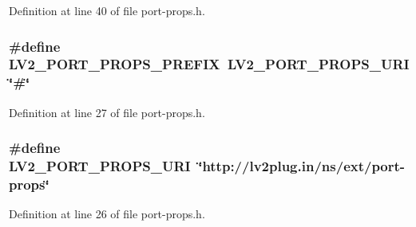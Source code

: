 Definition at line 40 of file port-\/props.\+h.

\subsubsection[{\texorpdfstring{L\+V2\+\_\+\+P\+O\+R\+T\+\_\+\+P\+R\+O\+P\+S\+\_\+\+P\+R\+E\+F\+IX}{LV2_PORT_PROPS_PREFIX}}]{\setlength{\rightskip}{0pt plus 5cm}\#define L\+V2\+\_\+\+P\+O\+R\+T\+\_\+\+P\+R\+O\+P\+S\+\_\+\+P\+R\+E\+F\+IX~{\bf L\+V2\+\_\+\+P\+O\+R\+T\+\_\+\+P\+R\+O\+P\+S\+\_\+\+U\+RI} \char`\"{}\#\char`\"{}}\hypertarget{port-props_8h_ab06a532dc01863154fb741425a78f45e}{}\label{port-props_8h_ab06a532dc01863154fb741425a78f45e}


Definition at line 27 of file port-\/props.\+h.

\subsubsection[{\texorpdfstring{L\+V2\+\_\+\+P\+O\+R\+T\+\_\+\+P\+R\+O\+P\+S\+\_\+\+U\+RI}{LV2_PORT_PROPS_URI}}]{\setlength{\rightskip}{0pt plus 5cm}\#define L\+V2\+\_\+\+P\+O\+R\+T\+\_\+\+P\+R\+O\+P\+S\+\_\+\+U\+RI~\char`\"{}http\+://{\bf lv2plug.\+in}/{\bf ns}/ext/port-\/props\char`\"{}}\hypertarget{port-props_8h_a2772d53568f74c7f36e095c2c913fd04}{}\label{port-props_8h_a2772d53568f74c7f36e095c2c913fd04}


Definition at line 26 of file port-\/props.\+h.

